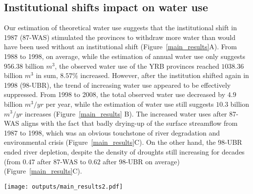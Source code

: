 
\subsection{Institutional shifts impact on water use}
\label{result-2}

\label{result-1-p2}
Our estimation of theoretical water use suggests that the institutional shift in 1987 (87-WAS) stimulated the provinces to withdraw more water than would have been used without an institutional shift (Figure~\ref{main_results}A).
From 1988 to 1998, on average, while the estimation of annual water use only suggests $956.38$ billion $m^3$, the observed water use of the YRB provinces reached $1038.36$ billion $m^3$ in sum, $8.57\%$ increased.
However, after the institution shifted again in 1998 (98-UBR), the trend of increasing water use appeared to be effectively suppressed. From 1998 to 2008, the total observed water use decreased by $4.9$ billion $m^3/yr$ per year, while the estimation of water use still suggests $10.3$ billion $m^3/yr$ increases (Figure~\ref{main_results} B).
The increased water uses after 87-WAS aligns with the fact that badly drying-up of the surface streamflow from 1987 to 1998, which was an obvious touchstone of river degradation and environmental crisis (Figure~\ref{main_results}C).
On the other hand, the 98-UBR ended river depletion, despite the density of droughts still increasing for decades (from $0.47$ after 87-WAS to $0.62$ after 98-UBR on average) (Figure~\ref{main_results}C).

\begin{figure*}[!h]
    \centering
    \texttt{[image: outputs/main\_results2.pdf]}
    \caption{
        Effects of two institutional shifts on water resources use and allocation in the Yellow River Basin (YRB).
        \textbf{A.} water uses of the YRB before and after the institutional shift in 1987 (87-WAS);
        \textbf{B.} water uses of the YRB before and after the institutional shift in 1998 (98-UBR). While the blue lines are statistic water use data, the grey ones are the estimation from the Differenced Synthetic Control method with economic and environmental background controlled.
        \textbf{C.} Drought intensity in the YRB and drying up events of the Yellow River. The size of the grey bubbles denotes the length of a drying upstream.
    }
    \label{main_results}
\end{figure*}


